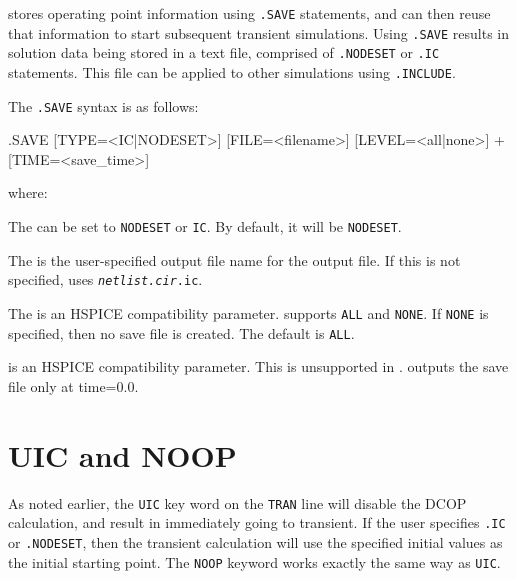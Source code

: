 
\Xyce{} stores operating point information using  \texttt{.SAVE} statements, and can then 
reuse that information to start subsequent transient simulations.  Using \texttt{.SAVE} results in
solution data being stored in a text file, comprised of \texttt{.NODESET} or \texttt{.IC}
statements.  This file can be applied to other simulations using \texttt{.INCLUDE}.

The \texttt{.SAVE} syntax is as follows:

\begin{vquote}
.SAVE [TYPE=<IC|NODESET>] [FILE=<filename>] [LEVEL=<all|none>]
+ [TIME=<save_time>]
\end{vquote}

where:

The  can be set to \texttt{NODESET} or \texttt{IC}.  By
default, it will be \texttt{NODESET}.  

The  is the user-specified output file name for the output file.
If this is not specified, \Xyce{} uses \texttt{\emph{netlist.cir}.ic}.

The  is an HSPICE compatibility parameter.  \Xyce{} supports
\texttt{ALL} and \texttt{NONE}. If \texttt{NONE} is specified, then no save
file is created. The default  is \texttt{ALL}.

 is an HSPICE compatibility parameter. This is unsupported
in \Xyce{}. \Xyce{} outputs the save file only at time=0.0.

\newpage
\section{UIC and NOOP}
\label{UIC_NOOP_spec}
 
As noted earlier, the \texttt{UIC} key word on the \texttt{TRAN} line
will disable the DCOP calculation, and result in \Xyce{} immediately
going to transient.  If the user specifies \texttt{.IC} or
\texttt{.NODESET}, then the transient
calculation will use the specified initial values as the initial
starting point.  The \texttt{NOOP} keyword works exactly the same way
as \texttt{UIC}.

